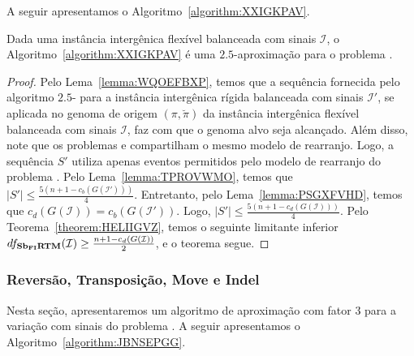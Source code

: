 A seguir apresentamos o Algoritmo~\ref{algorithm:XXIGKPAV}.



\begin{theorem}\label{theorem:BZSXXPYW}
Dada uma instância intergênica flexível balanceada com sinais $\mathcal{I}$, o Algoritmo~\ref{algorithm:XXIGKPAV} é uma $2.5$-aproximação para o problema \SbFIRTM{}.
\end{theorem}
\begin{proof}
Pelo Lema~\ref{lemma:WQOEFBXP}, temos que a sequência fornecida pelo algoritmo $2.5$-\SbIRT{} para a instância intergênica rígida balanceada com sinais $\mathcal{I'}$, se aplicada no genoma de origem $(\pi,\breve\pi)$ da instância intergênica flexível balanceada com sinais $\mathcal{I}$, faz com que o genoma alvo seja alcançado. Além disso, note que os problemas \SbIRTM{} e \SbFIRTM{} compartilham o mesmo modelo de rearranjo. Logo, a sequência $S'$ utiliza apenas eventos permitidos pelo modelo de rearranjo do problema \SbFIRTM{}. Pelo Lema~\ref{lemma:TPROVWMO}, temos que $|S'| \le \frac{5({n+1} - c_b(G(\mathcal{I}')))}{4}$. Entretanto, pelo Lema~\ref{lemma:PSGXFVHD}, temos que $c_d(G(\mathcal{I})) = c_b(G(\mathcal{I}'))$. Logo, $|S'| \le \frac{5({n+1} - c_d(G(\mathcal{I})))}{4}$. Pelo Teorema~\ref{theorem:HELIIGVZ}, temos o seguinte limitante inferior $df_{\textbf{Sb\textsubscript{FI}RTM}}(\mathcal{I}) \ge \frac{{n+1} - c_d(G(\mathcal{I}))}{2}$, e o teorema segue.
\end{proof}

\subsubsection{Reversão, Transposição, Move e Indel}

Nesta seção, apresentaremos um algoritmo de aproximação com fator $3$ para a variação com sinais do problema \SbFIRTMI{}. A seguir apresentamos o Algoritmo~\ref{algorithm:JBNSEPGG}.



